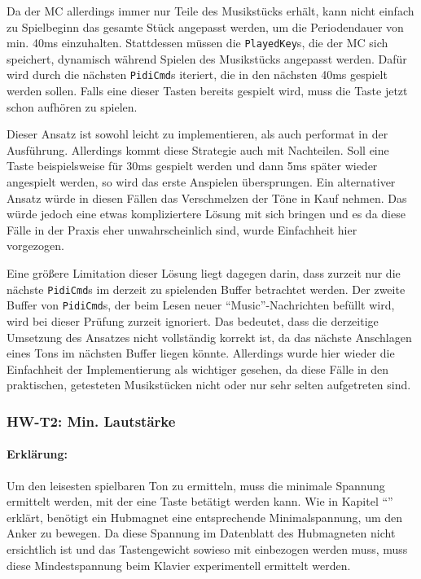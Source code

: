 Da der \ac{MC} allerdings immer nur Teile des Musikstücks erhält, kann nicht einfach zu Spielbeginn das gesamte Stück angepasst werden, um die Periodendauer von min. 40ms einzuhalten.
Stattdessen müssen die \lstinline|PlayedKey|s, die der \ac{MC} sich speichert, dynamisch während Spielen des Musikstücks angepasst werden.
Dafür wird durch die nächsten \lstinline|PidiCmd|s iteriert, die in den nächsten 40ms gespielt werden sollen. Falls eine dieser Tasten bereits gespielt wird, muss die Taste jetzt schon aufhören zu spielen.

Dieser Ansatz ist sowohl leicht zu implementieren, als auch performat in der Ausführung.
Allerdings kommt diese Strategie auch mit Nachteilen.
Soll eine Taste beispielsweise für 30ms gespielt werden und dann 5ms später wieder angespielt werden, so wird das erste Anspielen übersprungen.
Ein alternativer Ansatz würde in diesen Fällen das Verschmelzen der Töne in Kauf nehmen.
Das würde jedoch eine etwas kompliziertere Lösung mit sich bringen und es da diese Fälle in der Praxis eher unwahrscheinlich sind, wurde Einfachheit hier vorgezogen.

Eine größere Limitation dieser Lösung liegt dagegen darin, dass zurzeit nur die nächste \lstinline|PidiCmd|s im derzeit zu spielenden Buffer betrachtet werden.
Der zweite Buffer von \lstinline|PidiCmd|s, der beim Lesen neuer \enquote{Music}-Nachrichten befüllt wird, wird bei dieser Prüfung zurzeit ignoriert.
Das bedeutet, dass die derzeitige Umsetzung des Ansatzes nicht vollständig korrekt ist, da das nächste Anschlagen eines Tons im nächsten Buffer liegen könnte.
Allerdings wurde hier wieder die Einfachheit der Implementierung als wichtiger gesehen, da diese Fälle in den praktischen, getesteten Musikstücken nicht oder nur sehr selten aufgetreten sind.


\subsubsection{HW-T2: Min. Lautstärke}

\paragraph{Erklärung:}
Um den leisesten spielbaren Ton zu ermitteln, muss die minimale Spannung ermittelt werden, mit der eine Taste betätigt werden kann.
Wie in Kapitel \enquote{} erklärt, benötigt ein Hubmagnet eine entsprechende Minimalspannung, um den Anker zu bewegen.
Da diese Spannung im Datenblatt des Hubmagneten nicht ersichtlich ist und das Tastengewicht sowieso mit einbezogen werden muss, muss diese Mindestspannung beim Klavier experimentell ermittelt werden.

